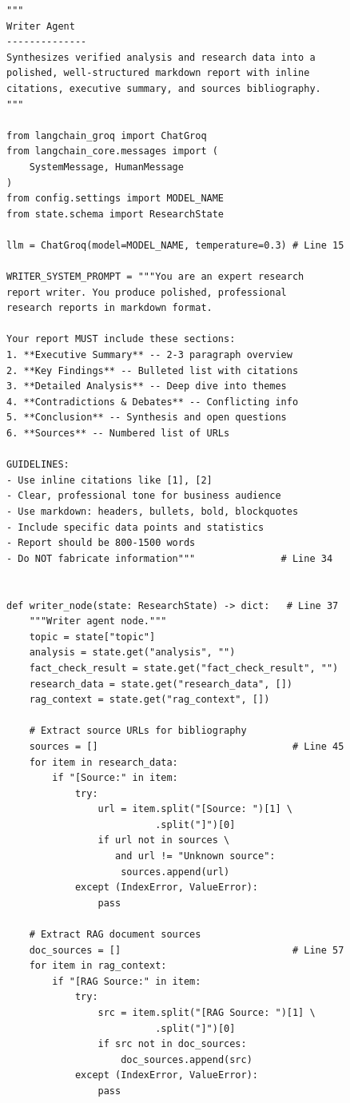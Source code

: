 \documentclass[12pt, a4paper]{article}
\begin{document}
\begin{lstlisting}[style=pythonstyle, title={\color{accentgreen}\faIcon{file} agents/writer.py --- Full Code (135 lines)}]
"""
Writer Agent
--------------
Synthesizes verified analysis and research data into a
polished, well-structured markdown report with inline
citations, executive summary, and sources bibliography.
"""

from langchain_groq import ChatGroq
from langchain_core.messages import (
    SystemMessage, HumanMessage
)
from config.settings import MODEL_NAME
from state.schema import ResearchState

llm = ChatGroq(model=MODEL_NAME, temperature=0.3) # Line 15

WRITER_SYSTEM_PROMPT = """You are an expert research
report writer. You produce polished, professional
research reports in markdown format.

Your report MUST include these sections:
1. **Executive Summary** -- 2-3 paragraph overview
2. **Key Findings** -- Bulleted list with citations
3. **Detailed Analysis** -- Deep dive into themes
4. **Contradictions & Debates** -- Conflicting info
5. **Conclusion** -- Synthesis and open questions
6. **Sources** -- Numbered list of URLs

GUIDELINES:
- Use inline citations like [1], [2]
- Clear, professional tone for business audience
- Use markdown: headers, bullets, bold, blockquotes
- Include specific data points and statistics
- Report should be 800-1500 words
- Do NOT fabricate information"""               # Line 34


def writer_node(state: ResearchState) -> dict:   # Line 37
    """Writer agent node."""
    topic = state["topic"]
    analysis = state.get("analysis", "")
    fact_check_result = state.get("fact_check_result", "")
    research_data = state.get("research_data", [])
    rag_context = state.get("rag_context", [])

    # Extract source URLs for bibliography
    sources = []                                  # Line 45
    for item in research_data:
        if "[Source:" in item:
            try:
                url = item.split("[Source: ")[1] \
                          .split("]")[0]
                if url not in sources \
                   and url != "Unknown source":
                    sources.append(url)
            except (IndexError, ValueError):
                pass

    # Extract RAG document sources
    doc_sources = []                              # Line 57
    for item in rag_context:
        if "[RAG Source:" in item:
            try:
                src = item.split("[RAG Source: ")[1] \
                          .split("]")[0]
                if src not in doc_sources:
                    doc_sources.append(src)
            except (IndexError, ValueError):
                pass


\end{lstlisting}
\end{document}
